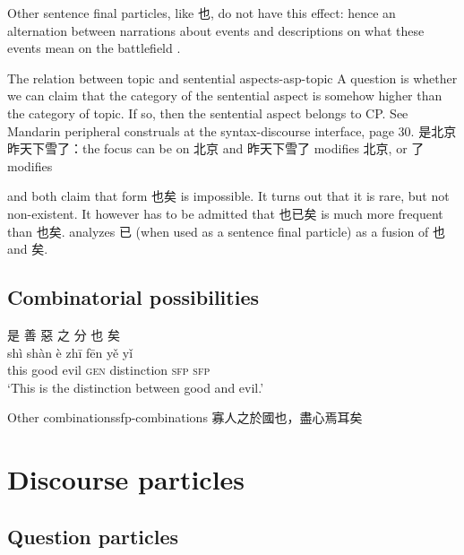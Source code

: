 \documentclass[UTF8, a4paper, oneside, scheme=plain, 12pt]{ctexrep}
\newcommand*{\citepage}[1]{p.~{#1}}
\newcommand*{\citepages}[1]{pp.~{#1}}
\newcommand{\translate}[1]{`#1'}
\newcommand*{\category}[1]{\textsc{#1}}
\begin{document}
Other sentence final particles, like 也, do not have this effect:
hence an alternation between narrations about events 
and descriptions on what these events mean on the battlefield
\citep[\citepages{444-445}]{meiguang2018}.

\begin{todobox}{The relation between topic and sentential aspect}{s-asp-topic}
    A question is whether we can claim that the category of the sentential aspect
    is somehow higher than the category of topic.
    If so, then the sentential aspect belongs to CP.
    See Mandarin peripheral construals at the syntax-discourse interface, page 30.
    是北京昨天下雪了：the focus can be on 北京 and 昨天下雪了 modifies 北京,
    or 了 modifies 
\end{todobox}

\citet[\citepage{445}]{meiguang2018} and \citet[\citepage{19}]{pulleyblank1995outline} both claim that form 也矣 is impossible.
It turns out that it is rare, but not non-existent.
It however has to be admitted that 也已矣 is much more frequent than 也矣.
\citet[\citepage{20}]{pulleyblank1995outline} analyzes 已 (when used as a sentence final particle) as a fusion of 也 and 矣.

\subsection{Combinatorial possibilities}

\begin{exe}
    \ex
    \glll 是 善 惡 之 分 也 矣 \\
    shì shàn è zhī fēn yě yǐ \\
    this good evil \category{gen} distinction \category{sfp} \category{sfp} \\
    \glt\translate{This is the distinction between good and evil.}
\end{exe}

\begin{todobox}{Other combinations}{sfp-combinations}
    寡人之於國也，盡心焉耳矣
\end{todobox}

\section{Discourse particles}

\subsection{Question particles}
\end{document}
